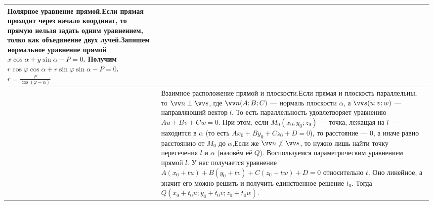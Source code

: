 \documentclass{article}
\let\vec\vv
\begin{document}
\begin{itemize}
\begin{Comment}
\begin{tabular}{|m{}|m{}|m{}|}
                \hline
                Полярное уравнение прямой.\newline Если прямая проходит через начало координат, то прямую нельзя задать одним уравнением, толко как объединение двух лучей.\newline Запишем нормальное уравнение прямой $x\cos\alpha+y\sin\alpha-P=0$. Получим $r\cos\varphi\cos\alpha+r\sin\varphi\sin\alpha-P=0$.\newline$r=\frac P{\cos(\varphi-\alpha)}$ & &\\
                \hline
                & \multicolumn{2}{m{0.6\textwidth}|}{Взаимное расположение прямой и плоскости.\newline Если прямая и плоскость параллельны, то $\vec n\perp\vec s$, где $\vec n(A;B;C)$ --- нормаль плоскости $\alpha$, а $\vec s(u;v;w)$ --- направляющий вектор $l$. То есть параллельность удовлетворяет уравнению $Au+Bv+Cw=0$. При этом, если $M_0(x_0;y_0;z_0)$ --- точка, лежащая на $l$ --- находится в $\alpha$ (то есть $Ax_0+By_0+Cz_0+D=0$), то расстояние --- 0, а иначе равно расстоянию от $M_0$ до $\alpha$,\newline Если же $\vec n\not\perp\vec s$, то нужно лишь найти точку пересечения $l$ и $\alpha$ (назовём её $Q$). Воспользуемся параметрическим уравнением прямой $l$. У нас получается уравнение $A(x_0+tu)+B(y_0+tv)+C(z_0+tw)+D=0$ относительно $t$. Оно линейное, а значит его можно решить и получить единственное решение $t_0$. Тогда $Q(x_0+t_0u;y_0+t_0v;z_0+t_0w)$.}\\
                \hline

\end{tabular}
\end{Comment}
\end{itemize}
\end{document}
